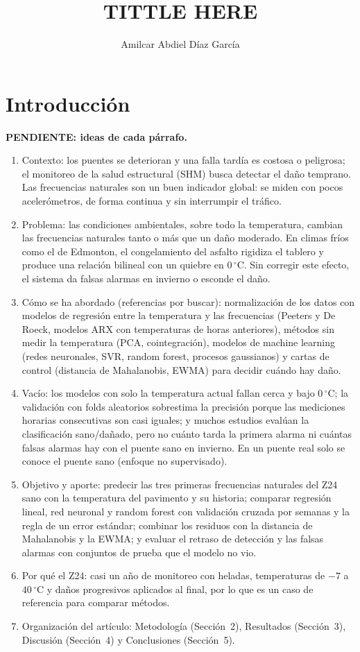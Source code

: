 \documentclass[9pt,twocolumn,twoside]{opticajnl}
\title{TITTLE HERE}
\author[1,*]{Amilcar Abdiel Díaz García}
\affil[1]{Department of Civil and Environmental Engineering, University of Alberta, Edmonton, AB, Canada}
\affil[*]{adiazgar@ualberta.ca}
\begin{document}
\maketitle

\section{Introducción}
\textbf{PENDIENTE: ideas de cada párrafo.}
\begin{enumerate}
\item Contexto: los puentes se deterioran y una falla tardía es costosa o peligrosa; el monitoreo de la salud estructural (SHM) busca detectar el daño temprano. Las frecuencias naturales son un buen indicador global: se miden con pocos acelerómetros, de forma continua y sin interrumpir el tráfico.
\item Problema: las condiciones ambientales, sobre todo la temperatura, cambian las frecuencias naturales tanto o más que un daño moderado. En climas fríos como el de Edmonton, el congelamiento del asfalto rigidiza el tablero y produce una relación bilineal con un quiebre en $0\,^\circ$C. Sin corregir este efecto, el sistema da falsas alarmas en invierno o esconde el daño.
\item Cómo se ha abordado (referencias por buscar): normalización de los datos con modelos de regresión entre la temperatura y las frecuencias (Peeters y De Roeck, modelos ARX con temperaturas de horas anteriores), métodos sin medir la temperatura (PCA, cointegración), modelos de machine learning (redes neuronales, SVR, random forest, procesos gaussianos) y cartas de control (distancia de Mahalanobis, EWMA) para decidir cuándo hay daño.
\item Vacío: los modelos con solo la temperatura actual fallan cerca y bajo $0\,^\circ$C; la validación con folds aleatorios sobrestima la precisión porque las mediciones horarias consecutivas son casi iguales; y muchos estudios evalúan la clasificación sano/dañado, pero no cuánto tarda la primera alarma ni cuántas falsas alarmas hay con el puente sano en invierno. En un puente real solo se conoce el puente sano (enfoque no supervisado).
\item Objetivo y aporte: predecir las tres primeras frecuencias naturales del Z24 sano con la temperatura del pavimento y su historia; comparar regresión lineal, red neuronal y random forest con validación cruzada por semanas y la regla de un error estándar; combinar los residuos con la distancia de Mahalanobis y la EWMA; y evaluar el retraso de detección y las falsas alarmas con conjuntos de prueba que el modelo no vio.
\item Por qué el Z24: casi un año de monitoreo con heladas, temperaturas de $-7$ a $40\,^\circ$C y daños progresivos aplicados al final, por lo que es un caso de referencia para comparar métodos.
\item Organización del artículo: Metodología (Sección~2), Resultados (Sección~3), Discusión (Sección~4) y Conclusiones (Sección~5).
\end{enumerate}
\end{document}
